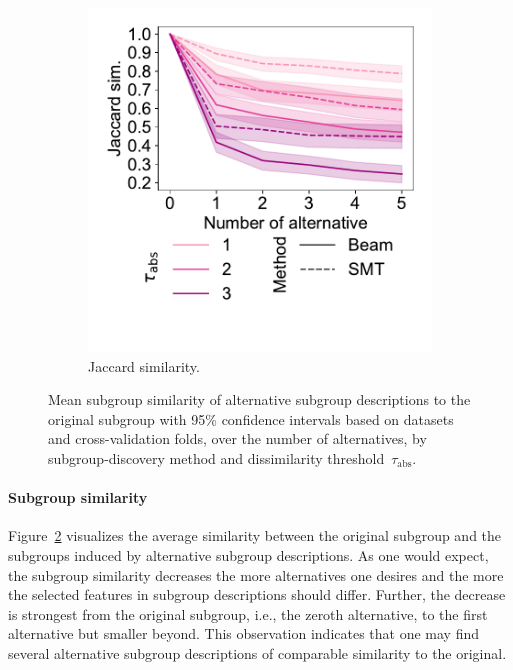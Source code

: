 \documentclass{article}
\theoremstyle{definition}
\begin{document}
\begin{figure}[t]
\begin{subfigure}[t]{0.48\textwidth}
		\includegraphics[width=\textwidth, trim=20 50 15 15, clip]{plots/csd-alternatives-jaccard.pdf}
		\caption{Jaccard similarity.}
		\label{fig:csd:alternatives-jaccard}
	\end{subfigure}
	\caption{
		Mean subgroup similarity of alternative subgroup descriptions to the original subgroup with 95\% confidence intervals based on datasets and cross-validation folds, over the number of alternatives, by subgroup-discovery method and dissimilarity threshold~$\tau_{\text{abs}}$.
	}
	\label{fig:csd:alternatives-similarity}
\end{figure}

\paragraph{Subgroup similarity}

Figure~\ref{fig:csd:alternatives-similarity} visualizes the average similarity between the original subgroup and the subgroups induced by alternative subgroup descriptions.
As one would expect, the subgroup similarity decreases the more alternatives one desires and the more the selected features in subgroup descriptions should differ.
Further, the decrease is strongest from the original subgroup, i.e., the zeroth alternative, to the first alternative but smaller beyond.
This observation indicates that one may find several alternative subgroup descriptions of comparable similarity to the original.
\end{document}
